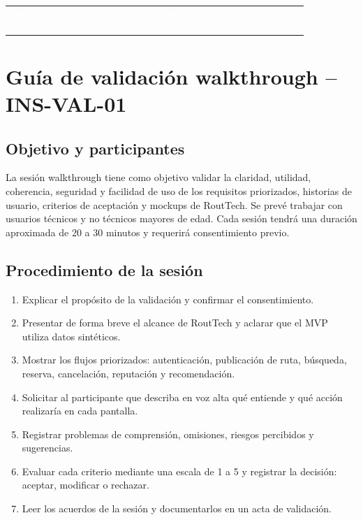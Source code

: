 \documentclass[10pt,a4paper]{article}
\begin{document}
\begingroup
\small
{}
\noindent\begin{tabularx}{\textwidth}{C{2.3cm} C{2.2cm} J J}
\textcolor{white}{\textbf{Hora}} &
\textcolor{white}{\textbf{Foco}} &
\textcolor{white}{\textbf{Descripción objetiva}} &
\textcolor{white}{\textbf{Implicación preliminar}}\\
\rule{0pt}{1.1cm} & & & \\
\rule{0pt}{1.1cm} & & & \\
\rule{0pt}{1.1cm} & & & \\
\end{tabularx}
\endgroup

\section{Guía de validación walkthrough -- INS-VAL-01}

\subsection{Objetivo y participantes}

La sesión walkthrough tiene como objetivo validar la claridad, utilidad, coherencia, seguridad y facilidad de uso de los requisitos priorizados, historias de usuario, criterios de aceptación y mockups de RoutTech. Se prevé trabajar con usuarios técnicos y no técnicos mayores de edad. Cada sesión tendrá una duración aproximada de 20 a 30 minutos y requerirá consentimiento previo.

\subsection{Procedimiento de la sesión}

\begin{enumerate}
  \item Explicar el propósito de la validación y confirmar el consentimiento.
  \item Presentar de forma breve el alcance de RoutTech y aclarar que el MVP utiliza datos sintéticos.
  \item Mostrar los flujos priorizados: autenticación, publicación de ruta, búsqueda, reserva, cancelación, reputación y recomendación.
  \item Solicitar al participante que describa en voz alta qué entiende y qué acción realizaría en cada pantalla.
  \item Registrar problemas de comprensión, omisiones, riesgos percibidos y sugerencias.
  \item Evaluar cada criterio mediante una escala de 1 a 5 y registrar la decisión: aceptar, modificar o rechazar.
  \item Leer los acuerdos de la sesión y documentarlos en un acta de validación.
\end{enumerate}
\end{document}
